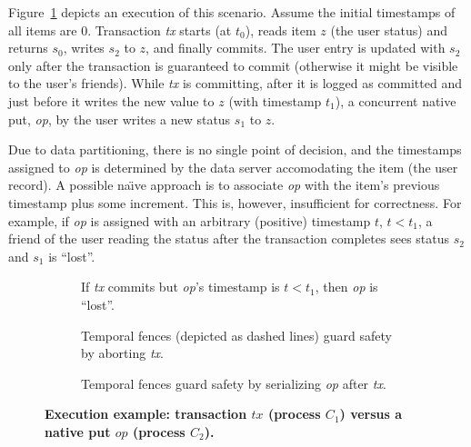 Figure~\ref{fig:mixedaccess} depicts an execution of this scenario. 
Assume the initial timestamps of all items are $0$. 
Transaction {\em tx\/} starts (at $t_0$), reads item $z$ (the user status) and
returns $s_0$, writes $s_2$ to $z$, and finally commits.
The user entry is
updated with $s_2$ only after the transaction is guaranteed to commit
(otherwise it might be visible to the user's friends).
While \emph{tx} is committing, after it is logged as committed 
and just before it writes the new value to $z$ (with timestamp $t_1$), a
concurrent native put, \emph{op}, by the user writes a new status $s_1$ to $z$.

Due to data partitioning, there is no single point of decision, and the
timestamps assigned to \emph{op} is determined by the data server
accomodating the item (the user record).
A possible na\"{\i}ve approach is to associate \emph{op} with the item's
previous timestamp plus some increment.
This is, however, insufficient for correctness. For example, if \emph{op} is
assigned %
with an arbitrary (positive) timestamp $t$, $t<t_1$, a friend of the user
reading the status after the transaction completes sees status $s_2$ and $s_1$
is ``lost''. 

\begin{figure}
        \centering
        \begin{subfigure}[b]{0.5\textwidth}
                \centering
                \scalebox{0.80}{}
                \caption{If \emph{tx} commits but \emph{op}'s timestamp is
                $t<t_1$, then \emph{op} is ``lost''.}
                \label{fig:mixedaccess}
        \end{subfigure}%
         
        \begin{subfigure}[b]{0.5\textwidth}
                \centering
                \scalebox{0.80}{}
                \caption{Temporal fences (depicted as dashed lines) guard safety
                by aborting \emph{tx}.}
                \label{fig:temporalfence}
        \end{subfigure}
          
        \begin{subfigure}[b]{0.5\textwidth}
                \centering
                \scalebox{0.80}{}
                \caption{Temporal fences guard safety by serializing \emph{op}
                after \emph{tx}.}
                \label{fig:disjoint}
        \end{subfigure}
        \caption{\bf{\small{Execution example: transaction $tx$
        (process $C_1$) versus a native put $op$ (process
        $C_2$).}}}\label{fig:mixed}
\end{figure}

